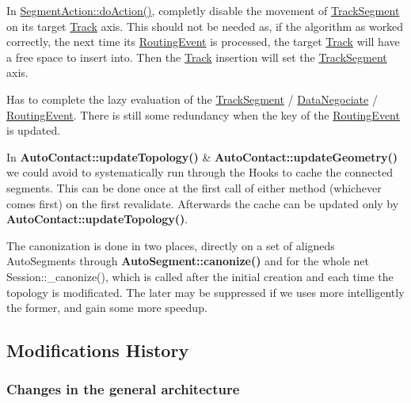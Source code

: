 \begin{DoxyItemize}
\item In \hyperlink{classKite_1_1SegmentAction_a324f17f0f5a09b76344eb2e003695d74}{Segment\+Action\+::do\+Action()}, completly disable the movement of \hyperlink{classKite_1_1TrackSegment}{Track\+Segment} on it\textquotesingle{}s target \hyperlink{classKite_1_1Track}{Track} axis. This should not be needed as, if the algorithm as worked correctly, the next time it\textquotesingle{}s \hyperlink{classKite_1_1RoutingEvent}{Routing\+Event} is processed, the target \hyperlink{classKite_1_1Track}{Track} will have a free space to insert into. Then the \hyperlink{classKite_1_1Track}{Track} insertion will set the \hyperlink{classKite_1_1TrackSegment}{Track\+Segment} axis.
\item Has to complete the lazy evaluation of the \hyperlink{classKite_1_1TrackSegment}{Track\+Segment} / \hyperlink{classKite_1_1DataNegociate}{Data\+Negociate} / \hyperlink{classKite_1_1RoutingEvent}{Routing\+Event}. There is still some redundancy when the key of the \hyperlink{classKite_1_1RoutingEvent}{Routing\+Event} is updated.
\item In \textbf{ Auto\+Contact\+::update\+Topology()} \& \textbf{ Auto\+Contact\+::update\+Geometry()} we could avoid to systematically run through the Hooks to cache the connected segments. This can be done once at the first call of either method (whichever comes first) on the first revalidate. Afterwards the cache can be updated only by \textbf{ Auto\+Contact\+::update\+Topology()}.
\item The canonization is done in two places, directly on a set of aligneds Auto\+Segments through \textbf{ Auto\+Segment\+::canonize()} and for the whole net Session\+::\+\_\+canonize(), which is called after the initial creation and each time the topology is modificated. The later may be suppressed if we uses more intelligently the former, and gain some more speedup.
\end{DoxyItemize}\hypertarget{pageNotes_secModificationsHistory}{}\subsection{Modifications History}\label{pageNotes_secModificationsHistory}
\hypertarget{pageNotes_ssecArchitectureChanges}{}\subsubsection{Changes in the general architecture}\label{pageNotes_ssecArchitectureChanges}

